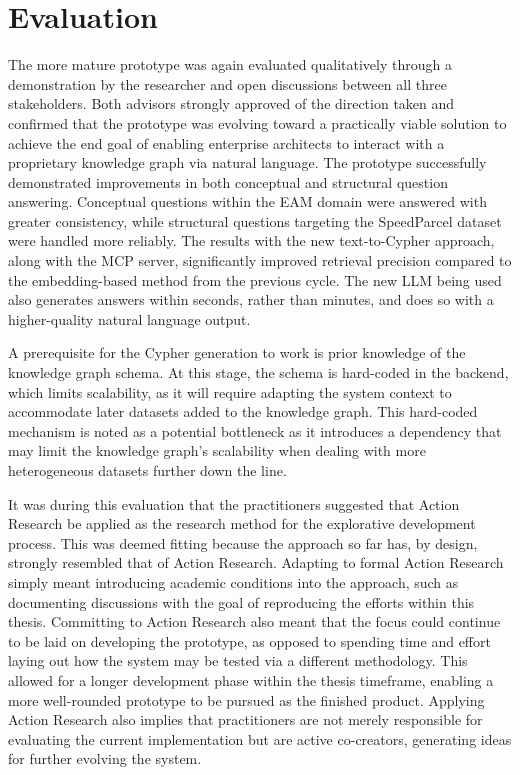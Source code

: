 \section{Evaluation}
\label{sec:cycle2_evaluation}
The more mature prototype was again evaluated qualitatively through a demonstration by the researcher and open discussions between all three stakeholders. Both advisors strongly approved of the direction taken and confirmed that the prototype was evolving toward a practically viable solution to achieve the end goal of enabling enterprise architects to interact with a proprietary knowledge graph via natural language. The prototype successfully demonstrated improvements in both conceptual and structural question answering. Conceptual questions within the EAM domain were answered with greater consistency, while structural questions targeting the SpeedParcel dataset were handled more reliably. The results with the new text-to-Cypher approach, along with the MCP server, significantly improved retrieval precision compared to the embedding-based method from the previous cycle. The new LLM being used also generates answers within seconds, rather than minutes, and does so with a higher-quality natural language output.

A prerequisite for the Cypher generation to work is prior knowledge of the knowledge graph schema. At this stage, the schema is hard-coded in the backend, which limits scalability, as it will require adapting the system context to accommodate later datasets added to the knowledge graph. This hard-coded mechanism is noted as a potential bottleneck as it introduces a dependency that may limit the knowledge graph's scalability when dealing with more heterogeneous datasets further down the line.

It was during this evaluation that the practitioners suggested that Action Research be applied as the research method for the explorative development process. This was deemed fitting because the approach so far has, by design, strongly resembled that of Action Research. Adapting to formal Action Research simply meant introducing academic conditions into the approach, such as documenting discussions with the goal of reproducing the efforts within this thesis. Committing to Action Research also meant that the focus could continue to be laid on developing the prototype, as opposed to spending time and effort laying out how the system may be tested via a different methodology. This allowed for a longer development phase within the thesis timeframe, enabling a more well-rounded prototype to be pursued as the finished product. Applying Action Research also implies that practitioners are not merely responsible for evaluating the current implementation but are active co-creators, generating ideas for further evolving the system.

